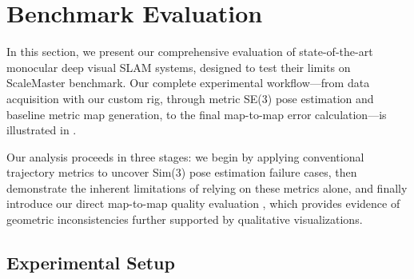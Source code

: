 % 
\section{Benchmark Evaluation}
\label{sec:exp}

In this section, we present our comprehensive evaluation of state-of-the-art monocular deep visual SLAM systems, designed to test their limits on ScaleMaster benchmark. Our complete experimental workflow—from data acquisition with our custom rig, through metric SE(3) pose estimation and baseline metric map generation, to the final map-to-map error calculation—is illustrated in . 

Our analysis proceeds in three stages: we begin by applying conventional trajectory metrics to uncover Sim(3) pose estimation failure cases, then demonstrate the inherent limitations of relying on these metrics alone, and finally introduce our direct map-to-map quality evaluation \cite{wu2021density}, which provides evidence of geometric inconsistencies further supported by qualitative visualizations.

% 
\subsection{Experimental Setup}
\label{sec:exp-setup}

